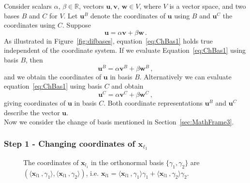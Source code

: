 \documentclass[letter,12pt]{article}
\begin{document}
{Consider scalars $\alpha, \, \beta \in \mathbb{R}$,  vectors $\bm{u}, \bm{v}$, $\bm{w} \in V $, where $V$ is a vector space, and two bases $B$ and $C$ for $V$. Let $\bm{u}^{B}$ denote the coordinates of $\bm{u}$ using $B$ and $\bm{u}^{C}$ the coordinates using $C$. Suppose 
\begin{equation}\label{eq:ChBas1}
     \bm{u} = \alpha \bm{v} + \beta \bm{w} \, . 
\end{equation}
As illustrated in Figure~\ref{fig:difbases}, equation~\eqref{eq:ChBas1} holds true independent of the coordinate system. If we evaluate Equation~\eqref{eq:ChBas1} using basis $B$, then 
\begin{equation}\label{eq:ChBas2}
     \bm{u}^B = \alpha \bm{v}^B + \beta \bm{w}^B \, , 
\end{equation}
and we obtain the coordinates of $\bm{u}$ in basis $B$. Alternatively we can evaluate equation~\eqref{eq:ChBas1} using basis $C$ and obtain 
\begin{equation}\label{eq:ChBas3}
     \bm{u}^C = \alpha \bm{v}^C + \beta \bm{w}^C \, , 
\end{equation}
giving coordinates of $\bm{u}$ in basis $C$. Both coordinate representations $\bm{u}^B$ and $\bm{u}^C$ describe the vector  $\bm{u}$.  \\

Now we consider the change of basis mentioned in Section~\ref{sec:MathFrame3}. 

\subsubsection{Step 1 - Changing coordinates of $\bm{x}_{\ell_1}$ }
\begin{figure}
    \centering
    \caption{\color{blue} The coordinates of $\bm{x}_{l_1}$ in the orthonormal basis $\{\gamma_1, \gamma_2\}$ are $\left( \langle \bm{x}_{l1}\, ,  \gamma_{1} \rangle, \langle \bm{x}_{l1}\, ,  \gamma_{2} \rangle \right)$, i.e. $\bm{x}_{l1} = \langle \bm{x}_{l1}\, ,  \gamma_{1} \rangle \gamma_1 + \langle \bm{x}_{l1}\, ,  \gamma_{2} \rangle \gamma_2$.    }
    \label{fig:dotprodcoords}
\end{figure}


}
\end{document}
